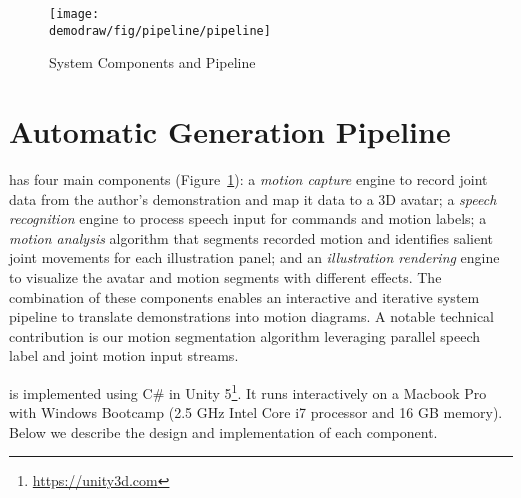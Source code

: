 
\begin{figure}[t]
  \centering
  \texttt{[image: \\demodraw/fig/pipeline/pipeline]}
  \caption{\systemname{} System Components and Pipeline}
  \label{fig:pipeline}
\end{figure}

\section{Automatic Generation Pipeline}


\systemname{} has four main components (Figure~\ref{fig:pipeline}):
%
a \emph{motion capture} engine to record joint data from the author's demonstration and map it data to a 3D avatar;
%
a \emph{speech recognition} engine to process speech input for commands and motion labels;
%
a \emph{motion analysis} algorithm that segments recorded motion and identifies salient joint movements for each illustration panel;
%
and an \emph{illustration rendering} engine to visualize the avatar and motion segments with different effects.
%
The combination of these components enables an interactive and iterative system pipeline to translate demonstrations into motion diagrams.
A notable technical contribution is our motion segmentation algorithm leveraging parallel speech label and joint motion input streams.

%
\systemname{} is implemented using C\# in Unity 5\footnote{\url{https://unity3d.com}}.
It runs interactively on a Macbook Pro with Windows Bootcamp (2.5 GHz Intel Core i7 processor and 16 GB memory).
%
Below we describe the design and implementation of each component.

